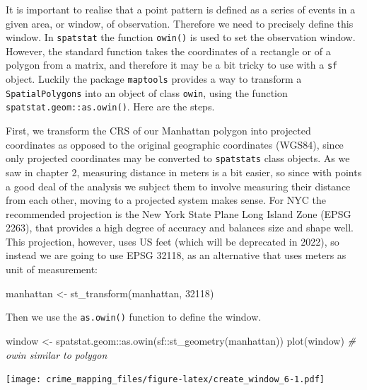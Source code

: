 \documentclass[
  krantz2]{krantz}
\makeatletter
\newenvironment{Shaded}{\begin{snugshade}}{\end{snugshade}}
\newcommand{\CommentTok}[1]{\textcolor[rgb]{0.37,0.37,0.37}{\textit{#1}}}
\newcommand{\DecValTok}[1]{\textcolor[rgb]{0.06,0.06,0.06}{#1}}
\newcommand{\FunctionTok}[1]{\textcolor[rgb]{0,0,0}{#1}}
\newcommand{\NormalTok}[1]{#1}
\newcommand{\OtherTok}[1]{\textcolor[rgb]{0.37,0.37,0.37}{#1}}
\newcommand{\SpecialCharTok}[1]{\textcolor[rgb]{0,0,0}{#1}}
\newenvironment{kframe}{%
\medskip{}
\setlength{\fboxsep}{.8em}
 \def\at@end@of@kframe{}%
 \ifinner\ifhmode%
  \def\at@end@of@kframe{\end{minipage}}%
  \begin{minipage}{\columnwidth}%
 \fi\fi%
 \def\FrameCommand##1{\hskip\@totalleftmargin \hskip-\fboxsep
 \colorbox{shadecolor}{##1}\hskip-\fboxsep
     \hskip-\linewidth \hskip-\@totalleftmargin \hskip\columnwidth}%
 \MakeFramed {\advance\hsize-\width
   \@totalleftmargin\z@ \linewidth\hsize
   \@setminipage}}%
 {\par\unskip\endMakeFramed%
 \at@end@of@kframe}
\renewenvironment{Shaded}{\begin{kframe}}{\end{kframe}}
\makeatother
\begin{document}
It is important to realise that a point pattern is defined as a series of events in a given area, or window, of observation. Therefore we need to precisely define this window. In \texttt{spatstat} the function \texttt{owin()} is used to set the observation window. However, the standard function takes the coordinates of a rectangle or of a polygon from a matrix, and therefore it may be a bit tricky to use with a \texttt{sf} object. Luckily the package \texttt{maptools} provides a way to transform a \texttt{SpatialPolygons} into an object of class \texttt{owin}, using the function \texttt{spatstat.geom::as.owin()}. Here are the steps.

First, we transform the CRS of our Manhattan polygon into projected coordinates as opposed to the original geographic coordinates (WGS84), since only projected coordinates may be converted to \texttt{spatstats} class objects. As we saw in chapter 2, measuring distance in meters is a bit easier, so since with points a good deal of the analysis we subject them to involve measuring their distance from each other, moving to a projected system makes sense. For NYC the recommended projection is the New York State Plane Long Island Zone (EPSG 2263), that provides a high degree of accuracy and balances size and shape well. This projection, however, uses US feet (which will be deprecated in 2022), so instead we are going to use EPSG 32118, as an alternative that uses meters as unit of measurement:

\begin{Shaded}
\begin{Highlighting}[]
\NormalTok{manhattan }\OtherTok{\textless{}{-}} \FunctionTok{st\_transform}\NormalTok{(manhattan, }\DecValTok{32118}\NormalTok{)}
\end{Highlighting}
\end{Shaded}

Then we use the \texttt{as.owin()} function to define the window.

\begin{Shaded}
\begin{Highlighting}[]
\NormalTok{window }\OtherTok{\textless{}{-}}\NormalTok{ spatstat.geom}\SpecialCharTok{::}\FunctionTok{as.owin}\NormalTok{(sf}\SpecialCharTok{::}\FunctionTok{st\_geometry}\NormalTok{(manhattan))}
\FunctionTok{plot}\NormalTok{(window) }\CommentTok{\# owin similar to polygon}
\end{Highlighting}
\end{Shaded}

\texttt{[image: crime\_mapping\_files/figure-latex/create\_window\_6-1.pdf]}
\end{document}
